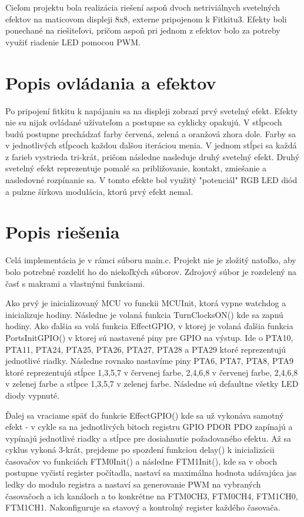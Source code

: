 \documentclass[a4paper,11pt]{article}
\begin{document}
Cieľom projektu bola realizácia riešení aspoň dvoch netriviálnych svetelných efektov na maticovom displeji 8x8, externe pripojenom k Fitkitu3. Efekty boli ponechané na riešiteľovi, pričom aspoň pri jednom z efektov bolo za potreby využiť riadenie LED pomocou PWM.

\section{Popis ovládania a efektov}
Po pripojení fitkitu k napájaniu sa na displeji zobrazí prvý svetelný efekt. Efekty nie su nijak ovládané užívateľom a postupne sa cyklicky opakujú. V stĺpcoch budú postupne prechádzať farby červená, zelená a oranžová zhora dole. Farby sa v jednotlivých stĺpcoch každou ďalšou iteráciou menia. V jednom stĺpci sa každá z farieb vystrieda tri-krát, pričom následne nasleduje druhý svetelný efekt. Druhý svetelný efekt reprezentuje pomalé sa približovanie, kontakt, zmiešanie a nasledovné rozpínanie sa. V tomto efekte bol využitý "potenciál" RGB LED diód a pulzne šírkova modulácia, ktorú prvý efekt nemal.

\section{Popis riešenia}
Celá implementácia je v rámci súboru main.c. Projekt nie je zložitý natoľko, aby bolo potrebné rozdeliť ho do niekoľkých súborov. Zdrojový súbor je rozdelený na časť s makrami a vlastnými funkciami.


Ako prvý je inicializovaný MCU vo funckii MCUInit, ktorá vypne watchdog a inicializuje hodiny. Následne je volaná funkcia TurnClocksON() kde sa zapnú hodiny. Ako ďalšia sa volá funkcia EffectGPIO, v ktorej je volaná ďalšia funkcia PortsInitGPIO() v ktorej sú nastavené piny pre GPIO na výstup. Ide o PTA10, PTA11, PTA24, PTA25, PTA26, PTA27, PTA28 a PTA29 ktoré reprezentujú jednotlivé riadky. Následne rovnako nastavíme piny PTA6, PTA7, PTA8, PTA9 ktoré reprezentujú stĺpce 1,3,5,7 v červenej farbe, 2,4,6,8 v červenej farbe, 2,4,6,8 v zelenej farbe a stĺpce 1,3,5,7 v zelenej farbe. Následne sú defaultne všetky LED diody vypnuté.


 Ďalej sa vraciame späť do funkcie EffectGPIO() kde sa už vykonáva samotný efekt - v cykle sa na jednotlivých bitoch registru GPIO PDOR PDO zapínajú a vypínajú jednotlivé riadky a stĺpce pre dosiahnutie požadovaného efektu. Až sa cyklus vykoná 3-krát, prejdeme po spozdení funkciou delay() k inicializácii časovačov vo funkciách FTM0Init() a následne FTM1Init(), kde sa v oboch postupne vyčistí register počítadla, nastaví  sa maximálna hodnota udávajúca jas ledky do modulo registra a nastaví sa generovanie PWM na vybraných časovačoch a ich kanáloch a to konkrétne na FTM0CH3, FTM0CH4, FTM1CH0, FTM1CH1. Nakonfiguruje sa stavový a kontrolný register každého časovača.
 
\end{document}
